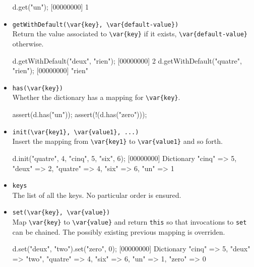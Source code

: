 \begin{itemize}
\begin{urbiscript}[firstnumber=last]
d.get("un");
[00000000] 1
\end{urbiscript}


\item \lstinline|getWithDefault(\var{key}, \var{default-value})|\\
  Return the value associated to  \lstinline|\var{key}| if it exists,
  \lstinline|\var{default-value}| otherwise.

\begin{urbiscript}[firstnumber=last]
d.getWithDefault("deux", "rien");
[00000000] 2
d.getWithDefault("quatre", "rien");
[00000000] "rien"
\end{urbiscript}


\item \lstinline|has(\var{key})|\\
  Whether the dictionary has a mapping for \lstinline|\var{key}|.

\begin{urbiscript}[firstnumber=last]
assert(d.has("un"));
assert(!(d.has("zero")));
\end{urbiscript}

\item \lstinline|init(\var{key1}, \var{value1}, ...)|~\\
  Insert the mapping from \lstinline|\var{key1}| to
  \lstinline|\var{value1}| and so forth.

\begin{urbiscript}[firstnumber=last]
d.init("quatre", 4, "cinq", 5, "six", 6);
[00000000] Dictionary {"cinq" => 5, "deux" => 2, "quatre" => 4, "six" => 6, "un" => 1}
\end{urbiscript}

\item \lstinline|keys|\\
  The list of all the keys.  No particular order is ensured.

\item \lstinline|set(\var{key}, \var{value})|\\
  Map \lstinline|\var{key}| to \lstinline|\var{value}| and return
  \lstinline|this| so that invocations to \lstinline|set| can be
  chained.  The possibly existing previous mapping is overriden.

\begin{urbiscript}[firstnumber=last]
d.set("deux", "two").set("zero", 0);
[00000000] Dictionary {"cinq" => 5, "deux" => "two", "quatre" => 4, "six" => 6, "un" => 1, "zero" => 0}
\end{urbiscript}


\end{itemize}
